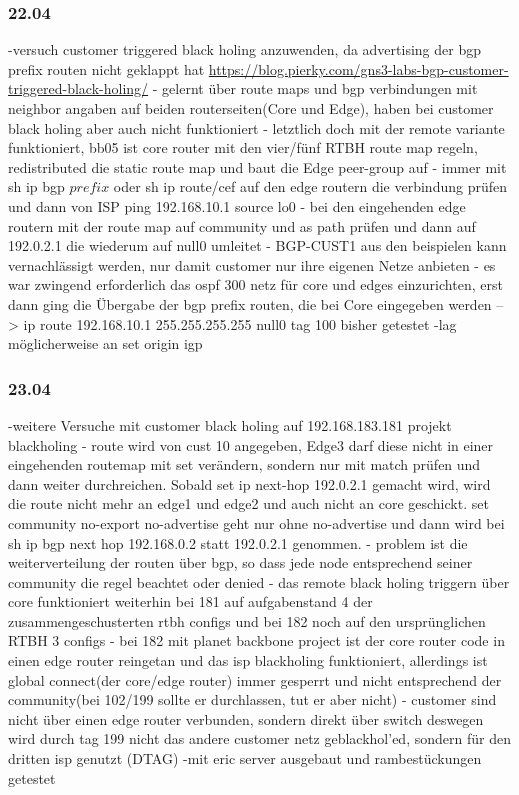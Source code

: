 \documentclass[english,runningheads,a4paper]{llncs}[2018/03/10]
\begin{document}
\subsubsection{22.04}
-versuch customer triggered black holing anzuwenden, da advertising der bgp prefix routen nicht geklappt hat \url{https://blog.pierky.com/gns3-labs-bgp-customer-triggered-black-holing/}
- gelernt über route maps und bgp verbindungen mit neighbor angaben auf beiden routerseiten(Core und Edge), haben bei customer black holing aber auch nicht funktioniert
- letztlich doch mit der remote variante funktioniert, bb05 ist core router mit den vier/fünf RTBH route map regeln, redistributed die static route map und baut die Edge peer-group auf
- immer mit sh ip bgp $prefix$ oder sh ip route/cef auf den edge routern die verbindung prüfen und dann von ISP ping 192.168.10.1 source lo0
- bei den eingehenden edge routern mit der route map auf community und as path prüfen und dann auf 192.0.2.1 die wiederum auf null0 umleitet
- BGP-CUST1 aus den beispielen kann vernachlässigt werden, nur damit customer nur ihre eigenen Netze anbieten
- es war zwingend erforderlich das ospf 300 netz für core und edges einzurichten, erst dann ging die Übergabe der bgp prefix routen, die bei Core eingegeben werden --> ip route 192.168.10.1 255.255.255.255 null0 tag 100 bisher getestet
-lag möglicherweise an set origin igp
\subsubsection{23.04}
-weitere Versuche mit customer black holing auf 192.168.183.181 projekt blackholing
- route wird von cust 10 angegeben, Edge3 darf diese nicht in einer eingehenden routemap mit set verändern, sondern nur mit match prüfen und dann weiter durchreichen. Sobald set ip next-hop 192.0.2.1 gemacht wird, wird die route nicht mehr an edge1 und edge2 und auch nicht an core geschickt.  set community no-export no-advertise geht nur ohne no-advertise und dann wird bei sh ip bgp next hop 192.168.0.2 statt 192.0.2.1 genommen.
- problem ist die weiterverteilung der routen über bgp, so dass jede node entsprechend seiner community die regel beachtet oder denied
- das remote black holing triggern über core funktioniert weiterhin bei 181 auf aufgabenstand 4 der zusammengeschusterten rtbh configs und bei 182 noch auf den ursprünglichen RTBH 3 configs
- bei 182 mit planet backbone project ist der core router code in einen edge router reingetan und das isp blackholing funktioniert, allerdings ist global connect(der core/edge router) immer gesperrt und nicht entsprechend der community(bei 102/199 sollte er durchlassen, tut er aber nicht)
- customer sind nicht über einen edge router verbunden, sondern direkt über switch deswegen wird durch tag 199 nicht das andere customer netz geblackhol'ed, sondern für den dritten isp genutzt (DTAG)
-mit eric server ausgebaut und rambestückungen getestet
\end{document}
